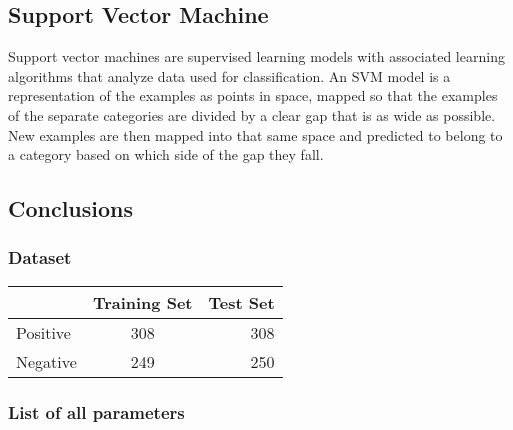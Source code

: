 \documentclass[11pt]{article}
\begin{document}
\subsection{Support Vector Machine}
Support vector machines are supervised learning models with associated learning algorithms that analyze data used for classification. An SVM model is a representation of the examples as points in space, mapped so that the examples of the separate categories are divided by a clear gap that is as wide as possible. New examples are then mapped into that same space and predicted to belong to a category based on which side of the gap they fall. 

\subsection{Conclusions}

\subsubsection{Dataset}
\begin{tabular}{|l|c|r|}
\hline
 & Training Set & Test Set\\
\hline
Positive & 308 & 308\\
\hline
Negative & 249 & 250\\
\hline
\end{tabular}

\subsubsection{List of all parameters}
\end{document}
